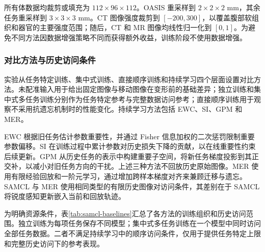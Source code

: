 所有体数据均裁剪或填充为
$112\times96\times112$。OASIS 重采样到
$2\times2\times2$ mm，其余任务重采样到
$3\times3\times3$ mm。CT 图像强度裁剪到
$[-200,300]$，以覆盖腹部软组织和器官的主要强度范围；随后，CT 和 MR 图像均线性归一化到 $[0,1]$。为避免不同方法因数据增强策略不同而获得额外收益，训练阶段不使用数据增强。

\subsubsection{对比方法与历史访问条件}
\label{subsubsec:samcl-baselines}

实验从任务特定训练、集中式训练、直接顺序训练和持续学习四个层面设置对比方法。未配准输入用于给出固定图像与移动图像在变形前的基础差异；独立训练和集中式多任务训练分别作为任务特定参考与完整数据访问参考；直接顺序训练用于观察不采用抗遗忘机制时的性能变化。持续学习方法包括 EWC、SI、GPM 和 MER。

EWC 根据旧任务估计参数重要性，并通过 Fisher 信息加权的二次惩罚限制重要参数偏移\cite{kirkpatrick2017ewc}。SI 在训练过程中累计参数对历史损失下降的贡献，以在线重要性约束后续更新\cite{method_regu_si}。GPM 从历史任务的表示中构建重要子空间，将新任务梯度投影到其正交补，以减小对旧任务方向的干扰\cite{saha2021gpm}。上述三种方法不回放历史原始图像。MER 使用有限经验回放和一阶元学习，通过增加跨样本梯度对齐来兼顾迁移与遗忘\cite{riemer2019mer}。SAMCL 与 MER 使用相同类型的有限历史图像对访问条件，其差别在于 SAMCL 将锐度感知更新嵌入当前和回放轨迹。

为明确资源条件，表\ref{tab:samcl-baselines}汇总了各方法的训练组织和历史访问范围。独立训练为每项任务保存不同模型；集中式多任务训练在一个模型中同时访问全部任务数据。二者不满足持续学习中的顺序访问条件，仅用于提供任务特定上限和完整历史访问下的参考表现。

